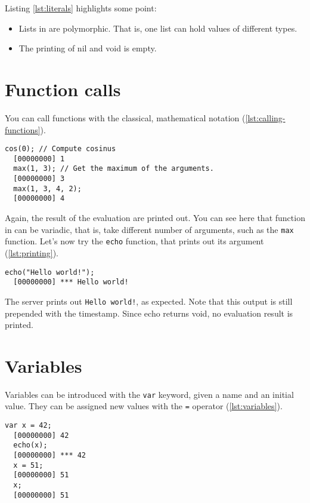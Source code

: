 \documentclass[openright,twoside,12pt]{report}
\newcommand{\lst}[1]{\autoref{lst:#1}}
\begin{document}
Listing \ref{lst:literals} highlights some point:
\begin{itemize}
\item Lists in \urbi are polymorphic. That is, one list can hold
  values of different types.
\item The printing of nil and void is empty.
\end{itemize}

\section{Function calls}

You can call functions with the classical, mathematical notation
(\lst{calling-functions}).

\begin{lstlisting}[caption=Calling functions,label=lst:calling-functions]
  cos(0); // Compute cosinus
  [00000000] 1
  max(1, 3); // Get the maximum of the arguments.
  [00000000] 3
  max(1, 3, 4, 2);
  [00000000] 4
\end{lstlisting}

Again, the result of the evaluation are printed out. You can see here
that function in \urbi can be variadic, that is, take different number
of arguments, such as the \texttt{max} function. Let's now try the
\texttt{echo} function, that prints out its argument (\lst{printing}).

\begin{lstlisting}[caption=Printing out,label=lst:printing]
  echo("Hello world!");
  [00000000] *** Hello world!
\end{lstlisting}

The server prints out \texttt{Hello world!}, as expected. Note that
this output is still prepended with the timestamp. Since echo returns
void, no evaluation result is printed.

\section{Variables}

Variables can be introduced with the \texttt{var} keyword, given a
name and an initial value. They can be assigned new values with the
\texttt{=} operator (\lst{variables}).

\begin{lstlisting}[caption=Using variables,label=lst:variables]
  var x = 42;
  [00000000] 42
  echo(x);
  [00000000] *** 42
  x = 51;
  [00000000] 51
  x;
  [00000000] 51
\end{lstlisting}
\end{document}
